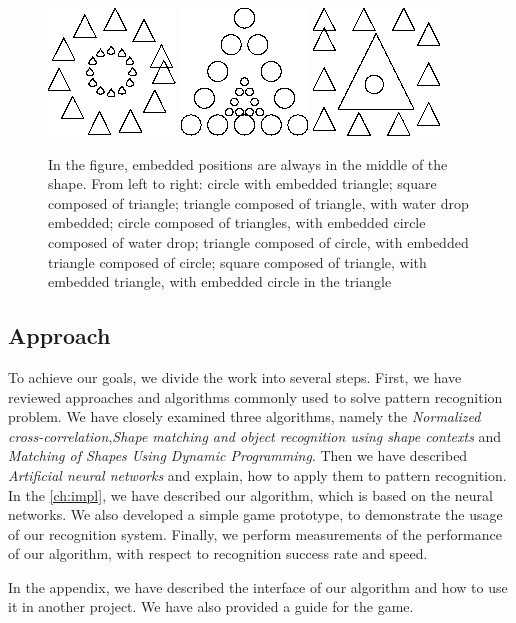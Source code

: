 \begin{figure}
\centering
\includegraphics[width=.3\linewidth]{ext/images/comp_in_comp.png}
\quad
\includegraphics[width=.3\linewidth]{ext/images/comp_in_comp2.png}
\quad
\includegraphics[width=.3\linewidth]{ext/images/triple.png}
\caption{In the figure, embedded positions are always in the middle of the shape. From left to right: circle with embedded triangle; square composed of triangle; triangle composed of triangle, with water drop embedded; circle composed of triangles, with embedded circle composed of water drop; triangle composed of circle, with embedded triangle composed of circle; square composed of triangle, with embedded triangle, with embedded circle in the triangle}
\label{fig:examples} 
\end{figure}

\subsection{Approach}
To achieve our goals, we divide the work into several steps. First, we have reviewed approaches and algorithms commonly used to solve pattern recognition problem. We have closely examined three algorithms, namely the \emph{Normalized cross-correlation},\emph{Shape matching and object recognition using shape contexts} and \emph{Matching of Shapes Using Dynamic Programming}. Then we have described \emph{Artificial neural networks} and explain, how to apply them to pattern recognition. In the \cref{ch:impl}, we have described our algorithm, which is based on the neural networks. We also developed a simple game prototype, to demonstrate the usage of our recognition system. Finally, we perform measurements of the performance of our algorithm, with respect to recognition success rate and speed.

In the appendix, we have described the interface of our algorithm and how to use it in another project. We have also provided a guide for the game.